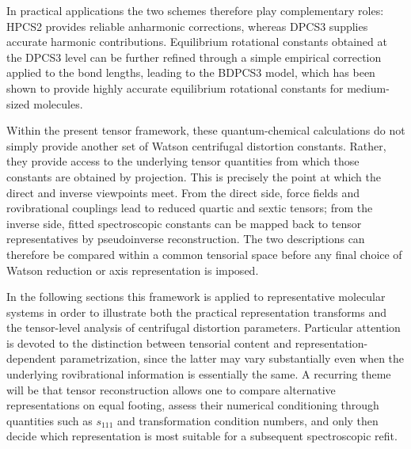 In practical applications the two schemes therefore play complementary roles:
HPCS2 provides reliable anharmonic corrections, whereas DPCS3 supplies accurate
harmonic contributions.  Equilibrium rotational constants obtained at the DPCS3
level can be further refined through a simple empirical correction applied to
the bond lengths, leading to the BDPCS3 model, which has been shown to provide
highly accurate equilibrium rotational constants for medium-sized molecules.

Within the present tensor framework, these quantum-chemical calculations do not
simply provide another set of Watson centrifugal distortion constants.  Rather,
they provide access to the underlying tensor quantities from which those
constants are obtained by projection.  This is precisely the point at which the
direct and inverse viewpoints meet.  From the direct side, force fields and
rovibrational couplings lead to reduced quartic and sextic tensors; from the
inverse side, fitted spectroscopic constants can be mapped back to tensor
representatives by pseudoinverse reconstruction.  The two descriptions can
therefore be compared within a common tensorial space before any final choice of
Watson reduction or axis representation is imposed.

In the following sections this framework is applied to representative molecular
systems in order to illustrate both the practical representation transforms and
the tensor-level analysis of centrifugal distortion parameters.  Particular
attention is devoted to the distinction between tensorial content and
representation-dependent parametrization, since the latter may vary
substantially even when the underlying rovibrational information is essentially
the same.  A recurring theme will be that tensor reconstruction allows one to
compare alternative representations on equal footing, assess their numerical
conditioning through quantities such as $s_{111}$ and transformation condition
numbers, and only then decide which representation is most suitable for a
subsequent spectroscopic refit.
